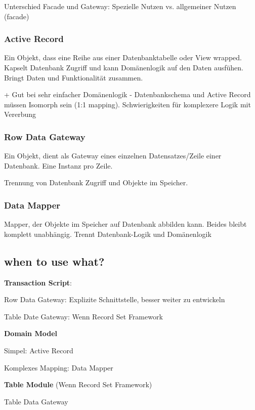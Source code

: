Unterschied Facade und Gateway: Spezielle Nutzen vs. allgemeiner Nutzen (facade)

\subsubsection{Active Record}
Ein Objekt, dass eine Reihe aus einer Datenbanktabelle oder View wrapped.
Kapselt Datenbank Zugriff und kann Domänenlogik auf den Daten ausfühen.
Bringt Daten und Funktionalität zusammen.

+ Gut bei sehr einfacher Domänenlogik
- Datenbankschema und Active Record müssen Isomorph sein (1:1 mapping). Schwierigkeiten für
komplexere Logik mit Vererbung

\subsubsection{Row Data Gateway}
Ein Objekt, dient als Gateway eines einzelnen Datensatzes/Zeile einer Datenbank. Eine Instanz pro
Zeile.

Trennung von Datenbank Zugriff und Objekte im Speicher.

\subsubsection{Data Mapper}
Mapper, der Objekte im Speicher auf Datenbank abbilden kann. Beides bleibt komplett unabhängig.
Trennt Datenbank-Logik und Domänenlogik

\subsection{when to use what?}
\begin{compactitem}
    \item \textbf{Transaction Script}:
    \begin{compactitem}
        \item Row Data Gateway: Explizite Schnittstelle, besser weiter zu entwickeln
        \item Table Date Gateway: Wenn Record Set Framework
    \end{compactitem}
    \item \textbf{Domain Model}
    \begin{compactitem}
        \item Simpel: Active Record
        \item Komplexes Mapping: Data Mapper
    \end{compactitem}
    \item \textbf{Table Module} (Wenn Record Set Framework)
    \begin{compactitem}
        \item Table Data Gateway
    \end{compactitem}
\end{compactitem}
